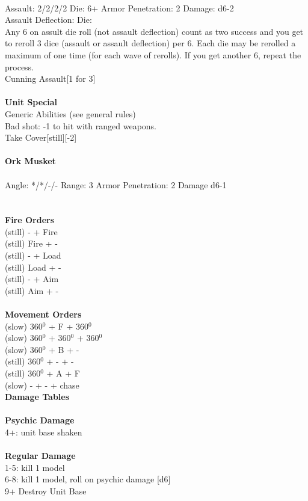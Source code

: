 \ \\
Assault: 2/2/2/2 Die: 6+ Armor Penetration: 2 Damage: d6-2 \\
Assault Deflection:  Die: \\
\indent Any 6 on assult die roll (not assault deflection) count as two success and you get to reroll 3 dice (assault or assault deflection) per 6. Each die may be rerolled a maximum of one time (for each wave of rerolls). If you get another 6, repeat the process. \\ Cunning Assault[1 for 3] \\
\ \\

{\bf Unit Special} \\
Generic Abilities (see general rules) \\Bad shot: -1 to hit with ranged weapons. \\ Take Cover[still][-2]
\ \\
\ \\
{\bf Ork Musket } \\
\ \\
Angle: */*/-/- Range: 3 Armor Penetration: 2 Damage d6-1 \\
\indent  \\





\ \\ {\bf Fire Orders } \\
(still) - + Fire \\
(still) Fire + -  \\
(still) - + Load \\
(still) Load + - \\
(still) - + Aim \\
(still) Aim + -  \\
\ \\ {\bf Movement Orders } \\
(slow) 360$^0$ + F + 360$^0$ \\
(slow) 360$^0$ + 360$^0$ + 360$^0$ \\
(slow) 360$^0$ + B + - \\
(still) 360$^0$ + - + - \\
(still) 360$^0$ + A + F \\
(slow) - + - + chase \\



{\bf Damage Tables} \\
\ \\ {\bf Psychic Damage } \\
4+: unit base shaken \\
\ \\ {\bf Regular Damage } \\
1-5: kill 1 model \\
6-8: kill 1 model, roll on psychic damage [d6] \\
9+ Destroy Unit Base \\



